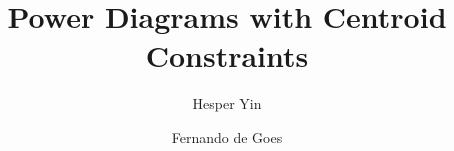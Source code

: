 \documentclass[sigconf, review, nonacm]{acmart}
\theoremstyle{definition}
\theoremstyle{plain}
\begin{document}
\title{Power Diagrams with Centroid Constraints}

\author{Hesper Yin}

\author{Fernando de Goes}

\begin{abstract}
\end{abstract}

\maketitle






% 
% 






\end{document}
